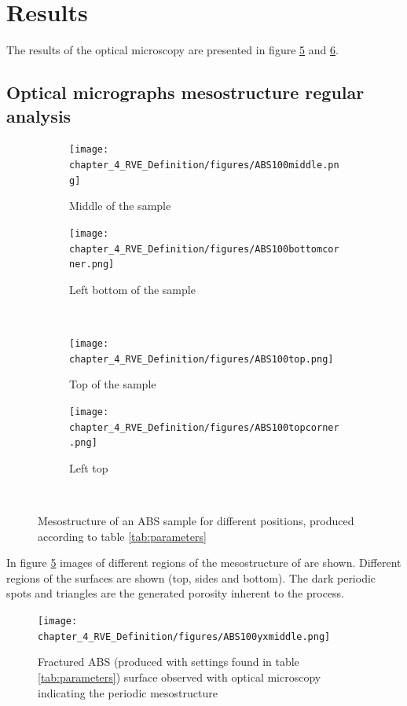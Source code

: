 \section{Results}
The results of the optical microscopy are presented in figure \ref{fig:Mesoresults} and \ref{fig:ABS100yxmiddle}. 

\subsection{Optical micrographs mesostructure regular analysis}

\begin{figure}
\centering
  \begin{subfigure}[b]{0.4\textwidth}
  \centering
    \texttt{[image: chapter\_4\_RVE\_Definition/figures/ABS100middle.png]}
    \caption{Middle of the sample}
    \label{fig:1.0}
  \end{subfigure}
  \begin{subfigure}[b]{0.4\textwidth}
    \texttt{[image: chapter\_4\_RVE\_Definition/figures/ABS100bottomcorner.png]}
    \caption{Left bottom of the sample}
    \label{fig:2}
  \end{subfigure}
  \\
    \begin{subfigure}[b]{0.4\textwidth}
    \texttt{[image: chapter\_4\_RVE\_Definition/figures/ABS100top.png]}
    \caption{Top of the sample}
    \label{fig:3}
  \end{subfigure}
  \begin{subfigure}[b]{0.4\textwidth}
    \texttt{[image: chapter\_4\_RVE\_Definition/figures/ABS100topcorner.png]}
    \caption{Left top}
    \label{fig:4}
  \end{subfigure}
  \\
  
  \caption{Mesostructure of an ABS sample for different positions, produced according to table \ref{tab:parameters}}
    \label{fig:Mesoresults}
\end{figure}

In figure \ref{fig:Mesoresults} images of different regions of the mesostructure of are shown. Different regions of the surfaces are shown (top, sides and bottom). The dark periodic spots and triangles are the generated porosity inherent to the process. 

\begin{figure}[H]
    \centering
    \texttt{[image: chapter\_4\_RVE\_Definition/figures/ABS100yxmiddle.png]}
    \caption{Fractured ABS (produced with settings found in table \ref{tab:parameters}) surface observed with optical microscopy indicating the periodic mesostructure}
    \label{fig:ABS100yxmiddle}
\end{figure}

